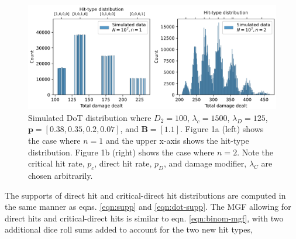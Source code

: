 \documentclass{article}
\begin{document}
        \begin{figure}[H]
            \centering
            \includegraphics[width=0.90\linewidth]{img/multi-dot-dmg-dist.PNG}
            \caption{Simulated DoT distribution where $D_2 = 100$, $\lambda_c = 1500$, $\lambda_D = 125$, $\textbf{p} = [0.38, 0.35, 0.2 , 0.07]$, and $\textbf{B} = [1.1]$. Figure 1a (left) shows the case where $n=1$ and the upper x-axis shows the hit-type distribution. Figure 1b (right) shows the case where $n=2$. Note the critical hit rate, $p_c$, direct hit rate, $p_D$, and damage modifier, $\lambda_C$ are chosen arbitrarily.}\label{fig:multi-dot-dmg-dist}
        \end{figure}
        
        The supports of direct hit and critical-direct hit distributions are computed in the same manner as eqns. \ref{eqn:supp} and \ref{eqn:dot-supp}. The MGF allowing for direct hits and critical-direct hits is similar to eqn. \ref{eqn:binom-mgf}, with two additional dice roll sums added to account for the two new hit types,
\end{document}
